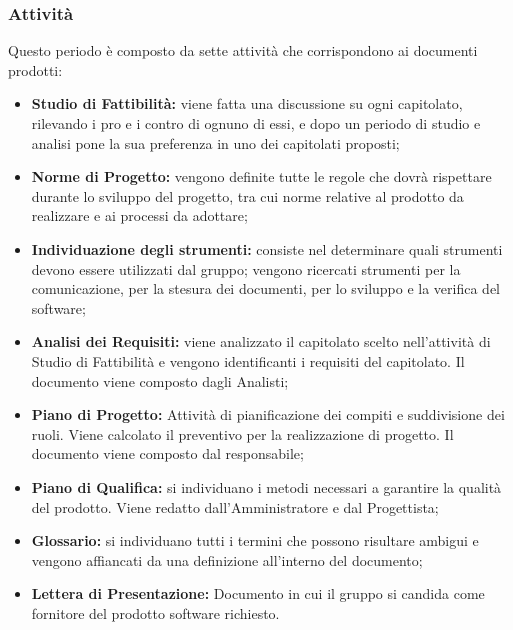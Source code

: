 \subsubsection{Attività}
Questo periodo è composto da sette attività che corrispondono ai documenti prodotti:
\begin{itemize}
	\item \textbf{Studio di Fattibilità:} viene fatta una discussione su ogni capitolato, rilevando i pro e i contro di ognuno di essi, e dopo un periodo di studio e analisi \Gruppo pone la sua preferenza in uno dei capitolati proposti;
	\item \textbf{Norme di Progetto:} vengono definite tutte le regole che \Gruppo dovrà rispettare durante lo sviluppo del progetto, tra cui norme relative al prodotto da realizzare e ai processi da adottare;
	\item \textbf{Individuazione degli strumenti:} consiste nel determinare quali strumenti devono essere utilizzati dal gruppo; vengono ricercati strumenti per la comunicazione, per la stesura dei documenti, per lo sviluppo e la verifica del software;
	\item \textbf{Analisi dei Requisiti:} viene analizzato il capitolato scelto nell'attività di Studio di Fattibilità e vengono identificanti i requisiti del capitolato. Il documento viene composto dagli Analisti;
	\item \textbf{Piano di Progetto:} Attività di pianificazione dei compiti e suddivisione dei ruoli. Viene calcolato il preventivo per la realizzazione di progetto. Il documento viene composto dal responsabile;
	\item \textbf{Piano di Qualifica:} si individuano i metodi necessari a garantire la qualità del prodotto. Viene redatto dall'Amministratore e dal Progettista;
	\item\textbf{Glossario:} si individuano tutti i termini che possono risultare ambigui e vengono affiancati da una definizione all'interno del documento;  
	\item \textbf{Lettera di Presentazione:} Documento in cui il gruppo \Gruppo si candida come fornitore del prodotto software richiesto.
\end{itemize}
